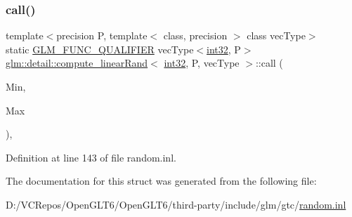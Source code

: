 \subsubsection{\texorpdfstring{call()}{call()}}
{\footnotesize\ttfamily template$<$precision P, template$<$ class, precision $>$ class vec\+Type$>$ \\
static \mbox{\hyperlink{setup_8hpp_a33fdea6f91c5f834105f7415e2a64407}{G\+L\+M\+\_\+\+F\+U\+N\+C\+\_\+\+Q\+U\+A\+L\+I\+F\+I\+ER}} vec\+Type$<$\mbox{\hyperlink{namespaceglm_1_1detail_a9f85b4efeca416cdcec2fd08939a2e17}{int32}}, P$>$ \mbox{\hyperlink{structglm_1_1detail_1_1compute__linear_rand}{glm\+::detail\+::compute\+\_\+linear\+Rand}}$<$ \mbox{\hyperlink{namespaceglm_1_1detail_a9f85b4efeca416cdcec2fd08939a2e17}{int32}}, P, vec\+Type $>$\+::call (\begin{DoxyParamCaption}\item[{vec\+Type$<$ \mbox{\hyperlink{namespaceglm_1_1detail_a9f85b4efeca416cdcec2fd08939a2e17}{int32}}, P $>$ const \&}]{Min,  }\item[{vec\+Type$<$ \mbox{\hyperlink{namespaceglm_1_1detail_a9f85b4efeca416cdcec2fd08939a2e17}{int32}}, P $>$ const \&}]{Max }\end{DoxyParamCaption})\hspace{0.3cm}{\ttfamily [inline]}, {\ttfamily [static]}}



Definition at line 143 of file random.\+inl.



The documentation for this struct was generated from the following file\+:\begin{DoxyCompactItemize}
\item 
D\+:/\+V\+C\+Repos/\+Open\+G\+L\+T6/\+Open\+G\+L\+T6/third-\/party/include/glm/gtc/\mbox{\hyperlink{random_8inl}{random.\+inl}}\end{DoxyCompactItemize}
